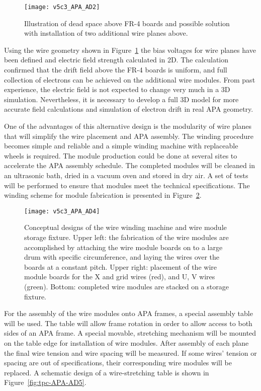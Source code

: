 \begin{figure}[htpb]
\centering
\texttt{[image: v5c3\_APA\_AD2]}
\caption[Illustration of dead space above FR-4 boards and possible solution]{Illustration of dead space above FR-4 boards and possible solution with installation of two additional wire planes above.}
\label{fig:tpc-APA-AD2}
\end{figure}


Using the wire geometry shown in Figure~\ref{fig:tpc-APA-AD2} the bias voltages for wire planes have been defined and electric field strength calculated in 2D. The calculation confirmed that the drift field above the FR-4 boards is uniform, and full collection of electrons can be achieved on the additional wire modules. From past experience,  the electric field is not expected to change very much in a 3D simulation. Nevertheless, it is necessary to develop a full 3D model for more accurate field calculations and simulation of electron drift in real APA geometry.
  
One of the advantages of this alternative design is the modularity of wire planes that will simplify the wire placement and APA assembly. The winding procedure becomes simple and reliable and a simple winding machine with replaceable wheels is required. The module production could be done at several sites to accelerate the APA assembly schedule. The completed modules will be cleaned in an ultrasonic bath, dried in a vacuum oven and stored in dry air. A set of tests will be performed to ensure that modules meet the technical specifications. The winding scheme for module fabrication is presented in Figure~\ref{fig:tpc-APA-AD4}.
                              

\begin{figure}[htpb]
\centering
\texttt{[image: v5c3\_APA\_AD4]}
\caption[Conceptual designs of the wire winding machine and wire module storage fixture]{Conceptual designs of the wire winding machine and wire module storage fixture.  Upper left: the fabrication of the wire modules are accomplished by attaching the wire module boards on to a large drum with specific circumference, and laying the wires over the boards at a constant pitch.  Upper right: placement of the wire module boards for the X and grid wires (red), and U, V wires (green).  Bottom: completed wire modules are stacked on a storage fixture.   }
\label{fig:tpc-APA-AD4}
\end{figure}


For the assembly of the wire modules onto APA frames, a special assembly table will be used. The table will allow frame rotation in order to allow access to both sides of an APA frame. A special movable, 
stretching mechanism will be mounted on the table edge for installation of wire modules. After assembly of each plane the final wire tension and wire spacing will be measured. If some wires' tension or spacing 
are out of specifications, their corresponding wire modules will be replaced. A schematic design of a wire-stretching table is shown in Figure~\ref{fig:tpc-APA-AD5}. 
                                
